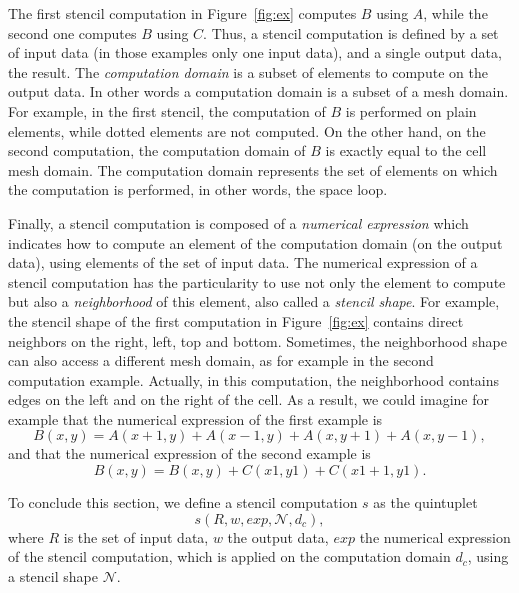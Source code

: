 
The first stencil computation in Figure~\ref{fig:ex} computes $B$ using $A$, while the second one computes $B$ using $C$. Thus, a stencil computation is defined by a set of input data (in those examples only one input data), and a single output data, the result. The \emph{computation domain} is a subset of elements to compute on the output data. In other words a computation domain is a subset of a mesh domain. For example, in the first stencil, the computation of $B$ is performed on plain elements, while dotted elements are not computed. On the other hand, on the second computation, the computation domain of $B$ is exactly equal to the cell mesh domain. The computation domain represents the set of elements on which the computation is performed, in other words, the space loop.

Finally, a stencil computation is composed of a \emph{numerical expression} which indicates how to compute an element of the computation domain (on the output data), using elements of the set of input data. The numerical expression of a stencil computation has the particularity to use not only the element to compute but also a \emph{neighborhood} of this element, also called a \emph{stencil shape}. For example, the stencil shape of the first computation in Figure~\ref{fig:ex} contains direct neighbors on the right, left, top and bottom. Sometimes, the neighborhood shape can also access a different mesh domain, as for example in the second computation example. Actually, in this computation, the neighborhood contains edges on the left and on the right of the cell. As a result, we could imagine for example that the numerical expression of the first example is
\begin{equation*} 
B(x,y) = A(x+1,y)+A(x-1,y)+A(x,y+1)+A(x,y-1),
\end{equation*}
and that the numerical expression of the second example is
\begin{equation*} 
B(x,y) = B(x,y)+C(x1,y1)+C(x1+1,y1).
\end{equation*}

To conclude this section, we define a stencil computation $s$ as the quintuplet
\begin{equation} 
s(R,w,exp,\mathcal{N},d_c),
\label{eq:st}
\end{equation}
where $R$ is the set of input data, $w$ the output data, $exp$ the numerical expression of the stencil computation, which is applied on the computation domain $d_c$, using a stencil shape $\mathcal{N}$.


